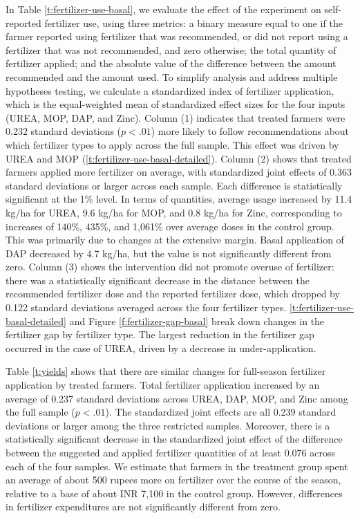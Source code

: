 \documentclass{article}
\begin{document}
In Table \ref{t:fertilizer-use-basal}, we evaluate the effect of the experiment on self-reported fertilizer use, using three metrics:  a binary measure equal to one if the farmer reported using fertilizer that was recommended, or did not report using a fertilizer that was not recommended, and zero otherwise; the total quantity of fertilizer applied; and the absolute value of the difference between the amount recommended and the amount used. To simplify analysis and address multiple hypotheses testing, we calculate a standardized index of fertilizer application, which is the equal-weighted mean of standardized effect sizes for the four inputs (UREA, MOP, DAP, and Zinc). Column (1) indicates that treated farmers were 0.232 standard deviations ($p<.01$) more likely to follow recommendations about which fertilizer types to apply across the full sample. This effect was driven by UREA and MOP (\ref{t:fertilizer-use-basal-detailed}). Column (2) shows that treated farmers applied more fertilizer on average, with standardized joint effects of 0.363 standard deviations or larger across each sample. Each difference is statistically significant at the 1\% level. In terms of quantities, average usage increased by 11.4 kg/ha for UREA, 9.6 kg/ha for MOP, and 0.8 kg/ha for Zinc, corresponding to increases of 140\%, 435\%, and 1,061\% over average doses in the control group. This was primarily due to changes at the extensive margin. Basal application of DAP decreased by 4.7 kg/ha, but the value is not significantly different from zero. Column (3) shows the intervention did not promote overuse of fertilizer: there was a statistically significant decrease in the distance between the recommended fertilizer dose and the reported fertilizer dose, which dropped by 0.122 standard deviations averaged across the four fertilizer types. \ref{t:fertilizer-use-basal-detailed} and Figure \ref{f:fertilizer-gap-basal} break down changes in the fertilizer gap by fertilizer type. The largest reduction in the fertilizer gap occurred in the case of UREA, driven by a decrease in under-application. 

Table \ref{t:yields} shows that there are similar changes for full-season fertilizer application by treated farmers. Total fertilizer application increased by an average of 0.237 standard deviations across UREA, DAP, MOP, and Zinc among the full sample ($p < .01$). The standardized joint effects are all 0.239 standard deviations or larger among the three restricted samples. Moreover, there is a statistically significant decrease in the standardized joint effect of the difference between the suggested and applied fertilizer quantities of at least 0.076 across each of the four samples. We estimate that farmers in the treatment group spent an average of about 500 rupees more on fertilizer over the course of the season, relative to a base of about INR 7,100 in the control group. However, differences in fertilizer expenditures are not significantly different from zero. 
\end{document}
